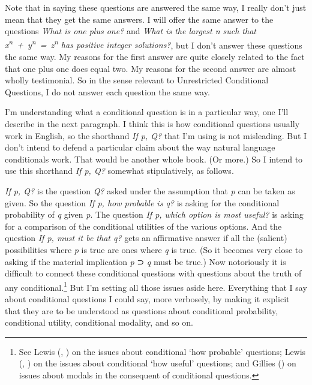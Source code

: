 \documentclass[
  10pt,
  letterpaper,
  twoside]{scrbook}
\begin{document}
Note that in saying these questions are answered the same way, I really
don't just mean that they get the same answers. I will offer the same
answer to the questions \emph{What is one plus one?} and \emph{What is
the largest n such that
x\textsuperscript{n}~+~y\textsuperscript{n}~=~z\textsuperscript{n} has
positive integer solutions?}, but I don't answer these questions the
same way. My reasons for the first answer are quite closely related to
the fact that one plus one does equal two. My reasons for the second
answer are almost wholly testimonial. So in the sense relevant to
Unrestricted Conditional Questions, I do not answer each question the
same way.

I'm understanding what a conditional question is in a particular way,
one I'll describe in the next paragraph. I think this is how conditional
questions usually work in English, so the shorthand \emph{If p, Q?} that
I'm using is not misleading. But I don't intend to defend a particular
claim about the way natural language conditionals work. That would be
another whole book. (Or more.) So I intend to use this shorthand
\emph{If p, Q?} somewhat stipulatively, as follows.

\emph{If p, Q?} is the question \emph{Q?} asked under the assumption
that \emph{p} can be taken as given. So the question \emph{If p, how
probable is q?} is asking for the conditional probability of \emph{q}
given \emph{p}. The question \emph{If p, which option is most useful?}
is asking for a comparison of the conditional utilities of the various
options. And the question \emph{If p, must it be that q?} gets an
affirmative answer if all the (salient) possibilities where \emph{p} is
true are ones where \emph{q} is true. (So it becomes very close to
asking if the material implication \emph{p} ⊃ \emph{q} must be true.)
Now notoriously it is difficult to connect these conditional questions
with questions about the truth of any conditional.\footnote{See Lewis
  (, ) on
  the issues about conditional `how probable' questions; Lewis
  (, ) on
  the issues about conditional `how useful' questions; and Gillies
  () on issues about modals in the
  consequent of conditional questions.} But I'm setting all those issues
aside here. Everything that I say about conditional questions I could
say, more verbosely, by making it explicit that they are to be
understood as questions about conditional probability, conditional
utility, conditional modality, and so on.
\end{document}
